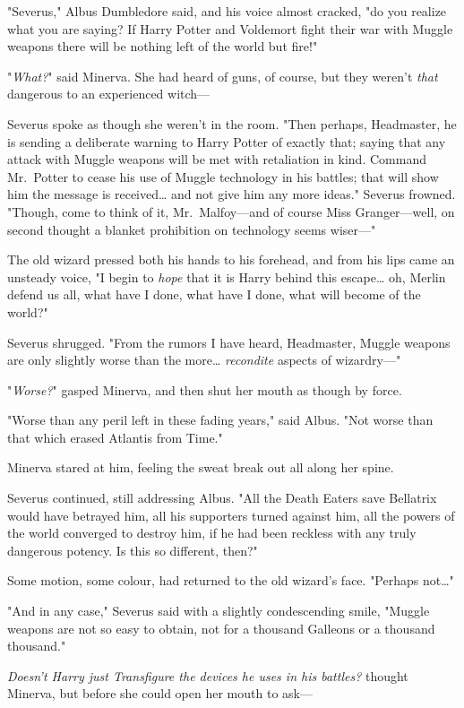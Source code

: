 "Severus," Albus Dumbledore said, and his voice almost cracked, "do you realize
what you are saying? If Harry Potter and Voldemort fight their war with Muggle
weapons there will be nothing left of the world but fire!"

"\emph{What?}" said Minerva. She had heard of guns, of course, but they weren't
\emph{that} dangerous to an experienced witch---

Severus spoke as though she weren't in the room. "Then perhaps, Headmaster, he
is sending a deliberate warning to Harry Potter of exactly that; saying that
any attack with Muggle weapons will be met with retaliation in kind. Command
Mr.~Potter to cease his use of Muggle technology in his battles; that will show
him the message is received{\ldots} and not give him any more ideas." Severus
frowned. "Though, come to think of it, Mr.~Malfoy---and of course Miss
Granger---well, on second thought a blanket prohibition on technology seems
wiser---"

The old wizard pressed both his hands to his forehead, and from his lips came
an unsteady voice, "I begin to \emph{hope} that it is Harry behind this
escape{\ldots} oh, Merlin defend us all, what have I done, what have I done,
what will become of the world?"

Severus shrugged. "From the rumors I have heard, Headmaster, Muggle weapons are
only slightly worse than the more{\ldots} \emph{recondite} aspects of
wizardry---"

"\emph{Worse?}" gasped Minerva, and then shut her mouth as though by force.

"Worse than any peril left in these fading years," said Albus. "Not worse than
that which erased Atlantis from Time."

Minerva stared at him, feeling the sweat break out all along her spine.

Severus continued, still addressing Albus. "All the Death Eaters save Bellatrix
would have betrayed him, all his supporters turned against him, all the powers
of the world converged to destroy him, if he had been reckless with any truly
dangerous potency. Is this so different, then?"

Some motion, some colour, had returned to the old wizard's face. "Perhaps
not{\ldots}"

"And in any case," Severus said with a slightly condescending smile, "Muggle
weapons are not so easy to obtain, not for a thousand Galleons or a thousand
thousand."

\emph{Doesn't Harry just Transfigure the devices he uses in his battles?}
thought Minerva, but before she could open her mouth to ask---

